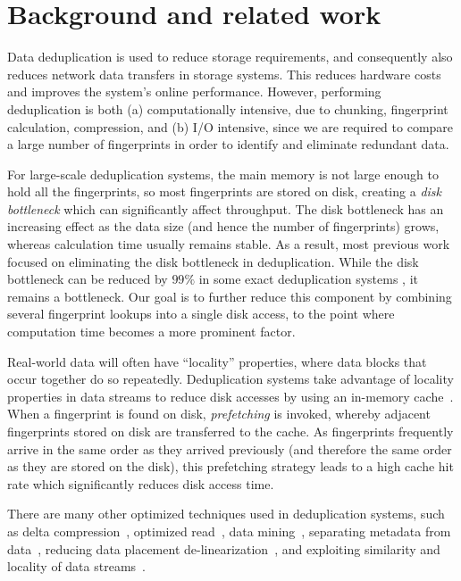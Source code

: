 \documentclass[prodmode,acmtecs]{acmsmall}
\begin{document}
\section{Background and related work}\label{se:back}

Data deduplication is used to reduce storage requirements, and consequently also reduces network data transfers in storage systems.  This reduces hardware costs and improves the system's online performance. However, performing deduplication is both (a) computationally intensive, due to chunking, fingerprint calculation, compression, and (b) I/O intensive, since we are required to compare a large number of fingerprints in order to identify and eliminate redundant data.

For large-scale deduplication systems, the main memory is not large enough to hold all the fingerprints, so most fingerprints are stored on disk, creating a \emph{disk bottleneck} which can significantly affect throughput. The disk bottleneck has an increasing effect as the data size (and hence the number of fingerprints) grows, whereas calculation time usually remains stable. As a result, most previous work focused on eliminating the disk bottleneck in deduplication.  While the disk bottleneck can be reduced by $99\%$ in some exact deduplication systems \cite{zhu2008avoiding}, it remains a bottleneck.  Our goal is to further reduce this component by combining several fingerprint lookups into a single disk access, to the point where computation time becomes a more prominent factor.

Real-world data will often have ``locality'' properties, where data blocks that occur together do so repeatedly.  Deduplication systems take advantage of locality properties in data streams to reduce disk accesses by using an in-memory cache~\cite{zhu2008avoiding,guo2011building,lillibridge2009sparse,bhagwat2009extreme,xia2011silo,srinivasan2012idedup,Botelho2013fast}.  When a fingerprint is found on disk, \emph{prefetching} is invoked, whereby adjacent fingerprints stored on disk are transferred to the cache. As fingerprints frequently arrive in the same order as they arrived previously (and therefore the same order as they are stored on the disk), this prefetching strategy leads to a high cache hit rate which significantly reduces disk access time.

There are many other optimized techniques used in deduplication systems, such as delta compression~\cite{Shilane2012WanOpt}, optimized read~\cite{Ng2013RevDedup,Mao2014readOpt}, data mining~\cite{Fu2014ATC}, separating metadata from data~\cite{Lin2015hotstorage}, reducing data placement de-linearization~\cite{Tan2015defrag}, and exploiting similarity and locality of data streams~\cite{Xia2015}.
\end{document}
